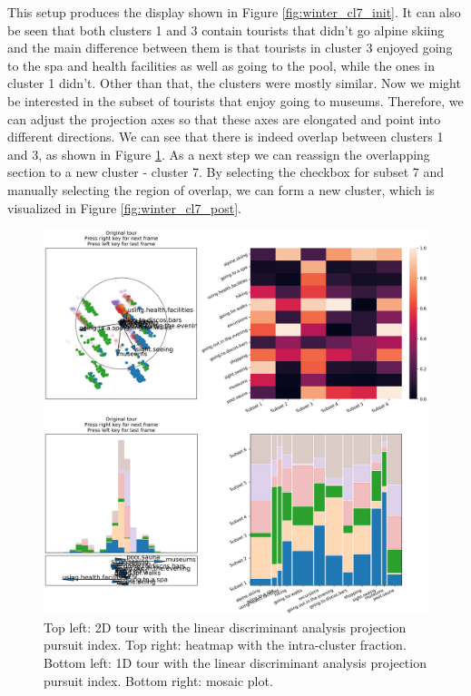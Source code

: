 \documentclass[article]{ajs}
\begin{document}
This setup produces the display shown in Figure \ref{fig:winter_cl7_init}. It can also be seen that both clusters 1 and 3 contain tourists that didn't go alpine skiing and the main difference between them is that tourists in cluster 3 enjoyed going to the spa and health facilities as well as going to the pool, while the ones in cluster 1 didn't. Other than that, the clusters were mostly similar. Now we might be interested in the subset of tourists that enjoy going to museums. Therefore, we can adjust the projection axes so that these axes are elongated and point into different directions. We can see that there is indeed overlap between clusters 1 and 3, as shown in Figure \ref{fig:winter_cl7_pre}. As a next step we can reassign the overlapping section to a new cluster - cluster 7. By selecting the checkbox for subset 7 and manually selecting the region of overlap, we can form a new cluster, which is visualized in Figure \ref{fig:winter_cl7_post}.

\begin{figure}[h!]
    \centering
    \includegraphics[width=1\textwidth]{winter_cl7_pre.png}
    \caption{Top left: 2D tour with the linear discriminant analysis projection pursuit index. Top right: heatmap with the intra-cluster fraction. Bottom left: 1D tour with the linear discriminant analysis projection pursuit index. Bottom right: mosaic plot.}
    \label{fig:winter_cl7_pre}
\end{figure}
\end{document}
